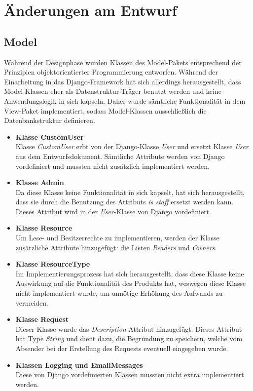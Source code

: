 \documentclass[parskip=full,11pt]{scrartcl}
\begin{document}
 \newpage
 \section{Änderungen am Entwurf}
 
 \subsection{Model}
Während der Designphase wurden Klassen des Model-Pakets entsprechend der Prinzipien objektorientierter Programmierung entworfen. Während der Einarbeitung in das Django-Framework hat sich allerdings herausgestellt, dass Model-Klassen eher als Datenstruktur-Träger benutzt werden und keine Anwendungslogik in sich kapseln. Daher wurde sämtliche Funktionalität in dem View-Paket implementiert, sodass Model-Klassen ausschließlich die Datenbankstruktur definieren.
 
\begin{itemize}
\item \textbf{Klasse CustomUser}\\
Klasse \textit{CustomUser} erbt von der Django-Klasse \textit{User} und ersetzt Klasse \textit{User} aus dem Entwurfsdokument. Sämtliche Attribute werden von Django vordefiniert und mussten nicht zusätzlich implementiert werden.

\item \textbf{Klasse Admin}\\
Da diese Klasse keine Funktionalität in sich kapselt, hat sich herausgestellt, dass sie durch die Benutzung des Attributs \textit{is staff} ersetzt werden kann. Dieses Attribut wird in der \textit{User}-Klasse von Django vordefiniert.
 
\item\textbf{Klasse Resource}\\
Um Lese- und Besitzerrechte zu implementieren, werden der Klasse zusätzliche Attribute hinzugefügt: die Listen \textit{Readers} und \textit{Owners}.

\item \textbf{Klasse ResourceType}\\
Im Implementierungsprozess hat sich herausgestellt, dass diese Klasse keine Auswirkung auf die Funktionalität des Produkts hat, weswegen diese Klasse nicht implementiert wurde, um unnötige Erhöhung des Aufwands zu vermeiden.

\item \textbf{Klasse Request}\\
Dieser Klasse wurde das \textit{Description}-Attribut hinzugefügt. Dieses Attribut hat Type \textit{String} und dient dazu, die Begründung zu speichern, welche vom Absender bei der Erstellung des Requests eventuell eingegeben wurde.

\item \textbf{Klassen Logging und EmailMessages}\\
Diese von Django vordefinierten Klassen mussten nicht extra implementiert werden. 
\end{itemize}
\end{document}
